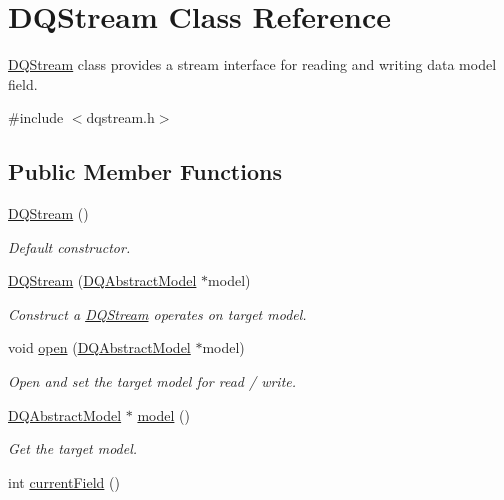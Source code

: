 \hypertarget{classDQStream}{
\section{DQStream Class Reference}
\label{classDQStream}
}


\hyperlink{classDQStream}{DQStream} class provides a stream interface for reading and writing data model field.  




{\ttfamily \#include $<$dqstream.h$>$}

\subsection*{Public Member Functions}
\begin{DoxyCompactItemize}
\item 
\hyperlink{classDQStream_a548b1f2c21543249ac263dbead7c125e}{DQStream} ()
\begin{DoxyCompactList}\small\item\em Default constructor. \item\end{DoxyCompactList}\item 
\hyperlink{classDQStream_ac27cdd0e3a3e28b1edc5f5a996205bd2}{DQStream} (\hyperlink{classDQAbstractModel}{DQAbstractModel} $\ast$model)
\begin{DoxyCompactList}\small\item\em Construct a \hyperlink{classDQStream}{DQStream} operates on target model. \item\end{DoxyCompactList}\item 
void \hyperlink{classDQStream_ac77b97b74f886bcedd0cc688cbfc00e0}{open} (\hyperlink{classDQAbstractModel}{DQAbstractModel} $\ast$model)
\begin{DoxyCompactList}\small\item\em Open and set the target model for read / write. \item\end{DoxyCompactList}\item 
\hypertarget{classDQStream_a03a3cf9809f43afda9d2456fac4c358e}{
\hyperlink{classDQAbstractModel}{DQAbstractModel} $\ast$ \hyperlink{classDQStream_a03a3cf9809f43afda9d2456fac4c358e}{model} ()}
\label{classDQStream_a03a3cf9809f43afda9d2456fac4c358e}

\begin{DoxyCompactList}\small\item\em Get the target model. \item\end{DoxyCompactList}\item 
\hypertarget{classDQStream_a81dd23f260f0ba41388a4122d46fd472}{
int \hyperlink{classDQStream_a81dd23f260f0ba41388a4122d46fd472}{currentField} ()}
\label{classDQStream_a81dd23f260f0ba41388a4122d46fd472}


\end{DoxyCompactItemize}
